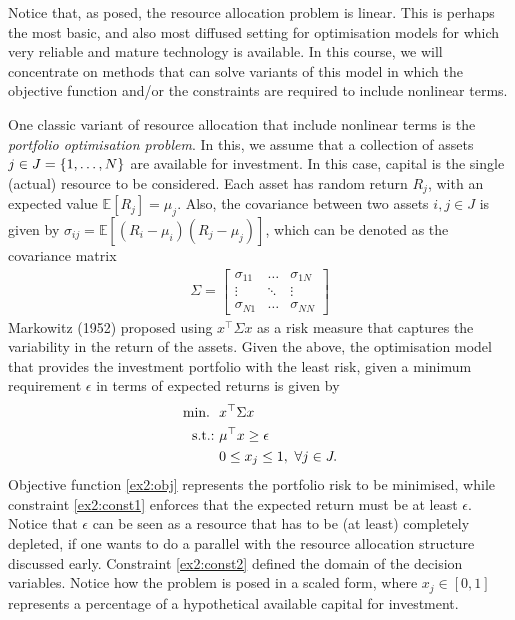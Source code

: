 Notice that, as posed, the resource allocation problem is linear. This is perhaps the most basic, and also most diffused setting for optimisation models for which very reliable and mature technology is available. In this course, we will concentrate on methods that can solve variants of this model in which the objective function and/or the constraints are required to include nonlinear terms. 

One classic variant of resource allocation that include nonlinear terms is the \emph{portfolio optimisation problem}. In this, we assume that a collection of assets $j \in J = \left\{ 1,\dots, N \right \}$ are available for investment. In this case, capital is the single (actual) resource to be considered. Each asset has random return $R_j$, with an expected value $\mathbb{E}[R_j] = \mu_j$. Also, the covariance between two assets $i,j \in J$ is given by $\sigma_{ij} = \mathbb{E}[(R_i - \mu_i)(R_j - \mu_j)]$, which can be denoted as the covariance matrix 
%
\begin{align*}
\Sigma = \begin{bmatrix}
 \sigma_{11} & \dots & \sigma_{1N} \\ 
 \vdots      & \ddots & \vdots \\
 \sigma_{N1}  & \dots & \sigma_{NN}
\end{bmatrix}
\end{align*}
%
Markowitz (1952) proposed using $x^\top\Sigma x$ as a risk measure that captures the variability in the return of the assets. Given the above, the optimisation model that provides the investment portfolio with the least risk, given a minimum requirement $\epsilon$ in terms of expected returns is given by
%
\begin{align}
	\mathop{\text{min.~}} \ &  x^\top\Sigma x \label{ex2:obj} \\
	\mathop{\text{s.t.:~}} & \mu^\top x  \geq \epsilon \label{ex2:const1}\\
	& 0 \leq x_j \leq 1, \ \forall j \in J. \label{ex2:const2}
\end{align} 
%
Objective function \eqref{ex2:obj} represents the portfolio risk to be minimised, while constraint \eqref{ex2:const1} enforces that the expected return must be at least $\epsilon$. Notice that $\epsilon$ can be seen as a resource that has to be (at least) completely depleted, if one wants to do a parallel with the resource allocation structure discussed early. Constraint \eqref{ex2:const2} defined the domain of the decision variables. Notice how the problem is posed in a scaled form, where $x_j \in [0,1]$ represents a percentage of a hypothetical available capital for investment.

